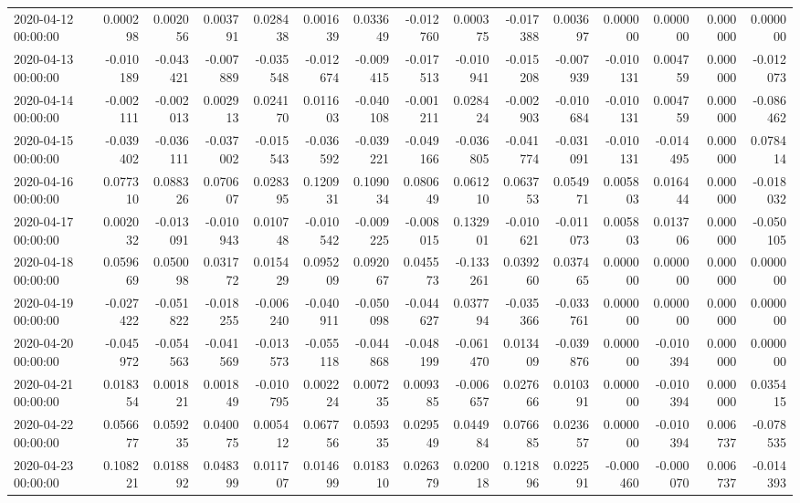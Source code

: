 \begin{tabular}{lrrrrrrrrrrrrrr}
2020-04-12 00:00:00 & 0.000298 & 0.002056 & 0.003791 & 0.028438 & 0.001639 & 0.033649 & -0.012760 & 0.000375 & -0.017388 & 0.003697 & 0.000000 & 0.000000 & 0.000000 & 0.000000 \\
2020-04-13 00:00:00 & -0.010189 & -0.043421 & -0.007889 & -0.035548 & -0.012674 & -0.009415 & -0.017513 & -0.010941 & -0.015208 & -0.007939 & -0.010131 & 0.004759 & 0.000000 & -0.012073 \\
2020-04-14 00:00:00 & -0.002111 & -0.002013 & 0.002913 & 0.024170 & 0.011603 & -0.040108 & -0.001211 & 0.028424 & -0.002903 & -0.010684 & -0.010131 & 0.004759 & 0.000000 & -0.086462 \\
2020-04-15 00:00:00 & -0.039402 & -0.036111 & -0.037002 & -0.015543 & -0.036592 & -0.039221 & -0.049166 & -0.036805 & -0.041774 & -0.031091 & -0.010131 & -0.014495 & 0.000000 & 0.078414 \\
2020-04-16 00:00:00 & 0.077310 & 0.088326 & 0.070607 & 0.028395 & 0.120931 & 0.109034 & 0.080649 & 0.061210 & 0.063753 & 0.054971 & 0.005803 & 0.016444 & 0.000000 & -0.018032 \\
2020-04-17 00:00:00 & 0.002032 & -0.013091 & -0.010943 & 0.010748 & -0.010542 & -0.009225 & -0.008015 & 0.132901 & -0.010621 & -0.011073 & 0.005803 & 0.013706 & 0.000000 & -0.050105 \\
2020-04-18 00:00:00 & 0.059669 & 0.050098 & 0.031772 & 0.015429 & 0.095209 & 0.092067 & 0.045573 & -0.133261 & 0.039260 & 0.037465 & 0.000000 & 0.000000 & 0.000000 & 0.000000 \\
2020-04-19 00:00:00 & -0.027422 & -0.051822 & -0.018255 & -0.006240 & -0.040911 & -0.050098 & -0.044627 & 0.037794 & -0.035366 & -0.033761 & 0.000000 & 0.000000 & 0.000000 & 0.000000 \\
2020-04-20 00:00:00 & -0.045972 & -0.054563 & -0.041569 & -0.013573 & -0.055118 & -0.044868 & -0.048199 & -0.061470 & 0.013409 & -0.039876 & 0.000000 & -0.010394 & 0.000000 & 0.000000 \\
2020-04-21 00:00:00 & 0.018354 & 0.001821 & 0.001849 & -0.010795 & 0.002224 & 0.007235 & 0.009385 & -0.006657 & 0.027666 & 0.010391 & 0.000000 & -0.010394 & 0.000000 & 0.035415 \\
2020-04-22 00:00:00 & 0.056677 & 0.059235 & 0.040075 & 0.005412 & 0.067756 & 0.059335 & 0.029549 & 0.044984 & 0.076685 & 0.023657 & 0.000000 & -0.010394 & 0.006737 & -0.078535 \\
2020-04-23 00:00:00 & 0.108221 & 0.018892 & 0.048399 & 0.011707 & 0.014699 & 0.018310 & 0.026379 & 0.020018 & 0.121896 & 0.022591 & -0.000460 & -0.000070 & 0.006737 & -0.014393 \\

\end{tabular}
